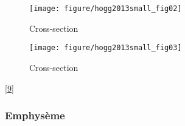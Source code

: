 \documentclass[12pt,]{article}
\begin{document}
\begin{figure}[h!]

{\centering \texttt{[image: figure/hogg2013small\_fig02]} 

}

\caption{Cross-section}\label{fig:unnamed-chunk-3}
\end{figure}

\begin{figure}[h!]

{\centering \texttt{[image: figure/hogg2013small\_fig03]} 

}

\caption{Cross-section}\label{fig:unnamed-chunk-4}
\end{figure}

{[}\protect\hyperlink{ref-reid1958secondary}{9}{]}

\hypertarget{emphysuxe8me}{%
\subsubsection{Emphysème}\label{emphysuxe8me}}
\end{document}
